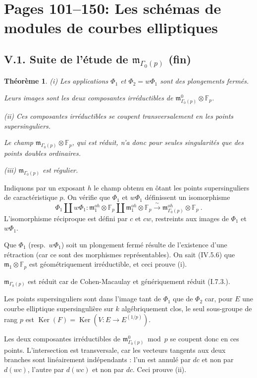 \documentclass[10pt,a4paper]{amsart}
\theoremstyle{plain}
\newtheorem{theorem}{Th\'eor\`eme}[section]
\theoremstyle{definition}
\DeclareMathOperator{\Ker}{Ker}
\newcommand{\m}{\mathfrak{m}}
\newcommand{\FF}{\mathbb{F}}
\begin{document}
\section*{Pages 101--150: Les sch\'emas de modules de courbes elliptiques}

\subsection*{V.1. Suite de l'\'etude de $\m_{\Gamma_0(p)}$ (fin)}

\setcounter{theorem}{15}
\begin{theorem}
\emph{(i)} Les applications $\Phi_1$ et $\Phi_2 = w\Phi_1$ sont des plongements ferm\'es.

Leurs images sont les deux composantes irr\'eductibles de $\m_{\Gamma_0(p)}^0 \otimes \FF_p$.

\emph{(ii)} Ces composantes irr\'eductibles se coupent transversalement en les points supersinguliers.

Le champ $\m_{\Gamma_0(p)} \otimes \FF_p$, qui est r\'eduit, n'a donc pour seules singularit\'es que des points doubles ordinaires.

\emph{(iii)} $\m_{\Gamma_0(p)}$ est r\'egulier.
\end{theorem}

Indiquons par un exposant $h$ le champ obtenu en \^otant les points supersinguliers de caract\'eristique $p$.
On v\'erifie que $\Phi_1$ et $w\Phi_1$ d\'efinissent un isomorphisme
\[
\Phi_1 \amalg w\Phi_1 : \m_1^{oh} \otimes \FF_p \amalg \m_1^{oh} \otimes \FF_p \xrightarrow{\;\sim\;} \m_{\Gamma_0(p)}^{oh} \otimes \FF_p\ .
\]
L'isomorphisme r\'eciproque est d\'efini par $c$ et $cw$, restreints aux images de $\Phi_1$ et $w\Phi_1$.

Que $\Phi_1$ (resp.\ $w\Phi_1$) soit un plongement ferm\'e r\'esulte de l'existence d'une r\'etraction (car ce sont des morphismes repr\'esentables). On sait (IV.5.6) que $\m_1 \otimes \FF_p$ est g\'eom\'etriquement irr\'eductible, et ceci prouve (i).

$\m_{\Gamma_0(p)}$ est r\'eduit car de Cohen-Macaulay et g\'en\'eriquement r\'eduit (I.7.3.).

Les points supersinguliers sont dans l'image tant de $\Phi_1$ que de $\Phi_2$ car, pour $E$ une courbe elliptique supersinguli\`ere sur $k$ alg\'ebriquement clos, le seul sous-groupe de rang $p$ est $\Ker(F) = \Ker(V : E \to E^{(1/p)})$.

Les deux composantes irr\'eductibles de $\m_{\Gamma_0(p)}^0 \bmod p$ se coupent donc en ces points. L'intersection est transversale, car les vecteurs tangents aux deux branches sont lin\'eairement ind\'ependants : l'un est annul\'e par $dc$ et non par $d(wc)$, l'autre par $d(wc)$ et non par $dc$. Ceci prouve (ii).
\end{document}
